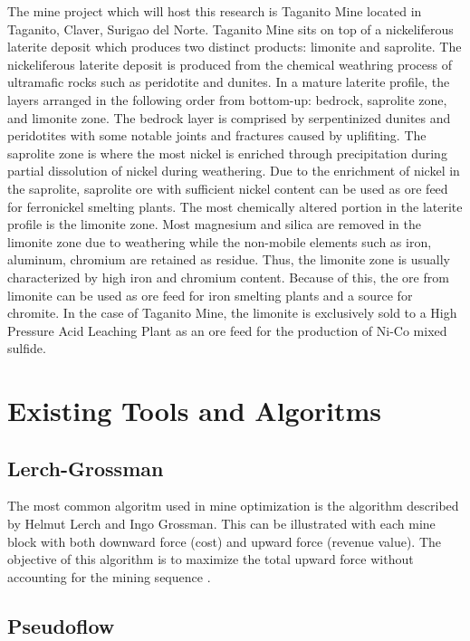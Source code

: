 \documentclass[12pt]{report}
\begin{document}
The mine project which will host this research is Taganito Mine located in Taganito, Claver, Surigao del Norte.
Taganito Mine sits on top of a nickeliferous laterite deposit which produces two distinct products: limonite and saprolite.
The nickeliferous laterite deposit is produced from the chemical weathring process of ultramafic rocks such as peridotite and dunites.
In a mature laterite profile, the layers arranged in the following order from bottom-up: bedrock, saprolite zone, and limonite zone.
The bedrock layer is comprised by serpentinized dunites and peridotites with some notable joints and fractures caused by uplifiting.
The saprolite zone is where the most nickel is enriched through precipitation during partial dissolution of nickel during weathering.
Due to the enrichment of nickel in the saprolite, saprolite ore with sufficient nickel content can be used as ore feed for ferronickel smelting plants.
The most chemically altered portion in the laterite profile is the limonite zone.
Most magnesium and silica are removed in the limonite zone due to weathering while the non-mobile elements such as iron, aluminum, chromium are retained as residue.
Thus, the limonite zone is usually characterized by high iron and chromium content.
Because of this, the ore from limonite can be used as ore feed for iron smelting plants and a source for chromite.
In the case of Taganito Mine, the limonite is exclusively sold to a High Pressure Acid Leaching Plant as an ore feed for the production of Ni-Co mixed sulfide.

\section{Existing Tools and Algoritms}

\subsection{Lerch-Grossman}

The most common algoritm used in mine optimization is the algorithm described by Helmut Lerch and Ingo Grossman.
This can be illustrated with each mine block with both downward force (cost) and upward force (revenue value).
The objective of this algorithm is to maximize the total upward force without accounting for the mining sequence \cite{IMS}.

\subsection{Pseudoflow}
\end{document}
